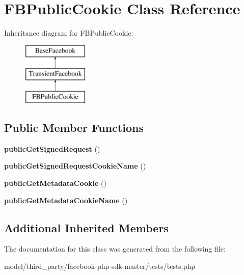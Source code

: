 \hypertarget{classFBPublicCookie}{\section{F\-B\-Public\-Cookie Class Reference}
\label{classFBPublicCookie}
}
Inheritance diagram for F\-B\-Public\-Cookie\-:\begin{figure}[H]
\begin{center}
\leavevmode
\includegraphics[height=3.000000cm]{classFBPublicCookie}
\end{center}
\end{figure}
\subsection*{Public Member Functions}
\begin{DoxyCompactItemize}
\item 
\hypertarget{classFBPublicCookie_a9b0d5c4bedfeedf7f41af913ec5f1ae8}{{\bfseries public\-Get\-Signed\-Request} ()}\label{classFBPublicCookie_a9b0d5c4bedfeedf7f41af913ec5f1ae8}

\item 
\hypertarget{classFBPublicCookie_aa4312c56cc8a68b19c2e06883047c1a6}{{\bfseries public\-Get\-Signed\-Request\-Cookie\-Name} ()}\label{classFBPublicCookie_aa4312c56cc8a68b19c2e06883047c1a6}

\item 
\hypertarget{classFBPublicCookie_ad3095c7e3209d49b654bf9b18cbbe49c}{{\bfseries public\-Get\-Metadata\-Cookie} ()}\label{classFBPublicCookie_ad3095c7e3209d49b654bf9b18cbbe49c}

\item 
\hypertarget{classFBPublicCookie_a4d9293176686a89d544cddef6f6967a3}{{\bfseries public\-Get\-Metadata\-Cookie\-Name} ()}\label{classFBPublicCookie_a4d9293176686a89d544cddef6f6967a3}

\end{DoxyCompactItemize}
\subsection*{Additional Inherited Members}


The documentation for this class was generated from the following file\-:\begin{DoxyCompactItemize}
\item 
model/third\-\_\-party/facebook-\/php-\/sdk-\/master/tests/tests.\-php\end{DoxyCompactItemize}
